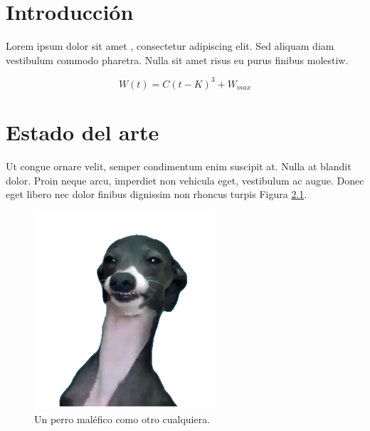 
\chapter{Introducción}

Lorem ipsum dolor sit amet \cite{robomind-web}, consectetur adipiscing elit. Sed aliquam diam vestibulum commodo pharetra. Nulla sit amet risus eu purus finibus molestiw.

\begin{equation}
W(t) = C(t-K)^{3} + W_{max}
\end{equation}


\chapter{Estado del arte}
Ut congue ornare velit, semper condimentum enim suscipit at. Nulla at blandit dolor. Proin neque arcu, imperdiet non vehicula eget, vestibulum ac augue. Donec eget libero nec dolor finibus dignissim non rhoncus turpis Figura \ref{fig:evil-dog}.

\begin{figure}[!ht]
	\begin{centering}
		\includegraphics[width=0.6\textwidth]{images/evil-dog.png}
			\caption{Un perro maléfico como otro cualquiera.}
				\label{fig:evil-dog}
	\end{centering}
\end{figure}



